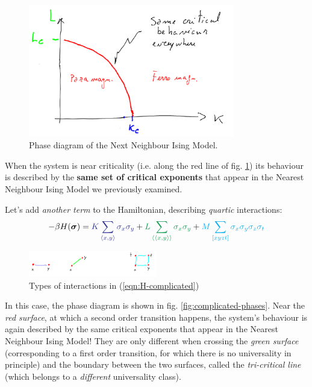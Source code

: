 \documentclass[../../main.tex]{subfiles}
\begin{document}
\begin{figure}[H]
    \centering
    \includegraphics[width=0.8\textwidth]{critical-n-nIM.png}
    \caption{Phase diagram of the Next Neighbour Ising Model.}
    \label{fig:critical-n-nIM}
\end{figure}

When the system is near criticality (i.e. along the red line of fig. \ref{fig:critical-n-nIM}) its behaviour is described by the \textbf{same set of critical exponents} that appear in the Nearest Neighbour Ising Model we previously examined. 

\medskip

Let's add \textit{another term} to the Hamiltonian, describing \textit{quartic} interactions:
\begin{align}\label{eqn:H-complicated}
    -\beta H(\bm{\sigma}) = \textcolor{Blue}{K \sum_{\langle x,y \rangle} \sigma_x \sigma_y} + \textcolor{ForestGreen}{L \sum_{\langle \langle x,y \rangle \rangle} \sigma_x \sigma_y} + \textcolor{Cyan}{M \sum_{[xyzt]} \sigma_x \sigma_y \sigma_z \sigma_t}
\end{align}
 
\begin{figure}[H]
    \centering
    \includegraphics[width=0.5\textwidth]{interactions.png}
    \caption{Types of interactions in (\ref{eqn:H-complicated})}
    \label{fig:interactions}
\end{figure}

In this case, the phase diagram is shown in fig. \ref{fig:complicated-phases}. Near the \textit{red surface}, at which a second order transition happens, the system's behaviour is again described by the same critical exponents that appear in the Nearest Neighbour Ising Model! They are only different when crossing the \textit{green surface} (corresponding to a first order transition, for which there is no universality in principle) and the boundary between the two surfaces, called the \textit{tri-critical line} (which belongs to a \textit{different} universality class).   
\end{document}
